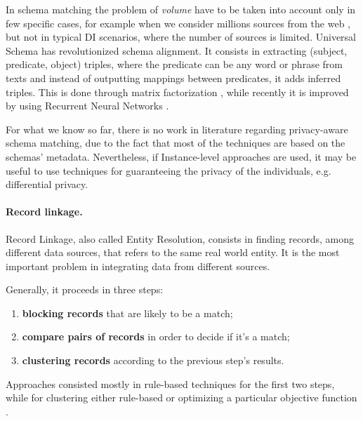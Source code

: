 \documentclass[12pt]{article}
\begin{document}
In schema matching the problem of \textit{volume} have to be taken into account only in few specific cases, for example when we consider millions sources from the web \cite*{Pimplikar2012}, but not in typical DI scenarios, 
where the number of sources is limited.
Universal Schema \cite*{Riedel2013} has revolutionized schema alignment. It consists in extracting (subject, predicate, object) triples, where the predicate can be any word or phrase from texts and instead of outputting 
mappings between predicates, it adds inferred triples. This is done through matrix factorization \cite*{Riedel2013}, while recently it is improved by using 
Recurrent Neural Networks \cite*{Das2016,Nee2015}.

For what we know so far, there is no work in literature regarding privacy-aware schema matching, due to the fact that most 
of the techniques are based on the schemas' metadata. Nevertheless, if Instance-level approaches are used, it may be useful 
to use techniques for guaranteeing the privacy of the individuals, e.g. differential privacy.




\paragraph{Record linkage.}
Record Linkage, also called Entity Resolution, consists in finding records, among different data sources, that refers to the same real world entity. 
It is the most important problem in integrating data from different sources. 

Generally, it proceeds in three steps: 
\begin{enumerate}
   \item \textbf{blocking records} that are likely to be a match;
   \item \textbf{compare pairs of records} in order to decide if it's a match;
   \item \textbf{clustering records} according to the previous step's results.
\end{enumerate}

Approaches consisted mostly in rule-based techniques \cite*{recordLinkTheory, Gal2011} for the first two steps, while for clustering either 
rule-based or optimizing a particular objective function \cite*{Hass2009}. 
\end{document}
